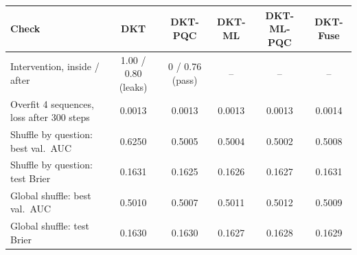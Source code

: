 \begin{tabular}{@{}l c c c c c@{}}
  \toprule
  Check & DKT & DKT-PQC & DKT-ML & DKT-ML-PQC & DKT-Fuse \\
  \midrule
  Intervention, inside / after           & 1.00 / 0.80 (leaks) & 0 / 0.76 (pass) & -- & -- & -- \\
  Overfit 4 sequences, loss after 300 steps & 0.0013 & 0.0013 & 0.0013 & 0.0013 & 0.0014 \\
  Shuffle by question: best val.\ AUC    & 0.6250 & 0.5005 & 0.5004 & 0.5002 & 0.5008 \\
  Shuffle by question: test Brier        & 0.1631 & 0.1625 & 0.1626 & 0.1627 & 0.1631 \\
  Global shuffle: best val.\ AUC         & 0.5010 & 0.5007 & 0.5011 & 0.5012 & 0.5009 \\
  Global shuffle: test Brier             & 0.1630 & 0.1630 & 0.1627 & 0.1628 & 0.1629 \\
  \bottomrule
\end{tabular}%